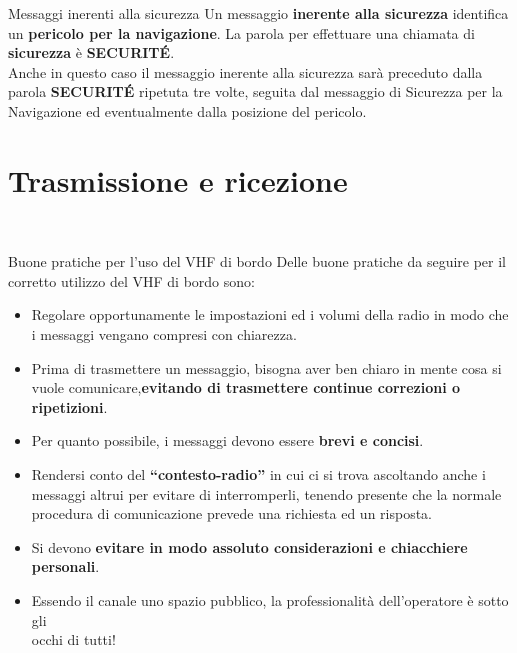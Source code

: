 \documentclass[aspectratio=169]{beamer}
\begin{document}
\begin{frame}{Messaggi inerenti alla sicurezza}
Un messaggio \textbf{inerente alla sicurezza} identifica un \textbf{pericolo per la navigazione}. La parola per effettuare una chiamata di \textbf{sicurezza} è \textbf{SECURITÉ}.\\
\smallskip
Anche in questo caso il messaggio inerente alla sicurezza sarà preceduto dalla parola \textbf{SECURITÉ} ripetuta tre volte, seguita dal messaggio di Sicurezza per la Navigazione ed eventualmente dalla posizione del pericolo.
\end{frame}

\section{Trasmissione e ricezione}
\begin{frame}
	\\
\end{frame}

\begin{frame}{Buone pratiche per l'uso del VHF di bordo}
	Delle buone pratiche da seguire per il corretto utilizzo del VHF di bordo sono:\\
	\begin{itemize}
		\item Regolare opportunamente le impostazioni ed i volumi della radio in modo che i messaggi vengano compresi con chiarezza.
		\item Prima di trasmettere un messaggio, bisogna aver ben chiaro in mente cosa si vuole comunicare,\textbf{evitando di trasmettere continue correzioni o ripetizioni}.
		\item Per quanto possibile, i messaggi devono essere \textbf{brevi e concisi}.
		\item Rendersi conto del \textbf{“contesto-radio”} in cui ci si trova ascoltando anche i messaggi altrui per evitare di interromperli, tenendo presente che la normale procedura di comunicazione prevede una richiesta ed un risposta.
		\item Si devono \textbf{evitare in modo assoluto considerazioni e chiacchiere personali}.
		\item {\textcolor{red!80}{Essendo il canale uno spazio pubblico, la professionalità dell'operatore è sotto gli \\occhi di tutti!}}
	\end{itemize}
\end{frame}
\end{document}
